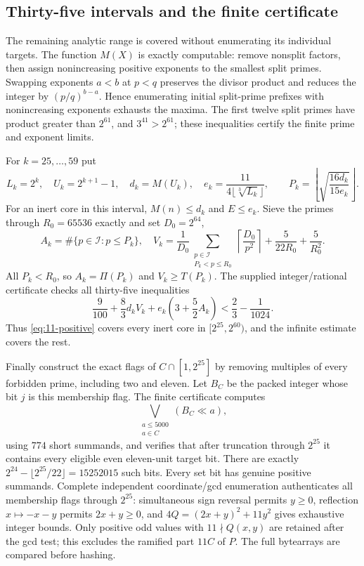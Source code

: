 \subsection{Thirty-five intervals and the finite certificate}

The remaining analytic range is covered without enumerating its
individual targets.  The function $M(X)$ is exactly computable:
remove nonsplit factors, then assign nonincreasing positive exponents
to the smallest split primes.  Swapping exponents $a<b$ at $p<q$
preserves the divisor product and reduces the integer by
$(p/q)^{b-a}$.  Hence enumerating initial split-prime prefixes with
nonincreasing exponents exhausts the maxima.  The first twelve split
primes have product greater than $2^{61}$, and $3^{41}>2^{61}$;
these inequalities certify the finite prime and exponent limits.

For $k=25,\ldots,59$ put
\[
 L_k=2^k,\quad U_k=2^{k+1}-1,\quad d_k=M(U_k),\quad
 e_k=\frac{11}{4\lfloor\sqrt[3]{L_k}\rfloor},\qquad
 P_k=\left\lfloor\sqrt{\frac{16d_k}{15e_k}}\right\rfloor.
\]
For an inert core in this interval, $M(n)\le d_k$ and $E\le e_k$.
Sieve the primes through $R_0=65536$ exactly and set $D_0=2^{64}$,
\[
 A_k=\#\{p\in\mathcal I:p\le P_k\},\quad
 V_k=\frac1{D_0}\sum_{\substack{p\in\mathcal I\\P_k<p\le R_0}}
                   \left\lceil\frac{D_0}{p^2}\right\rceil
                  +\frac5{22R_0}+\frac5{R_0^2}.
\]
All $P_k<R_0$, so $A_k=\Pi(P_k)$ and $V_k\ge T(P_k)$.
The supplied integer/rational certificate checks all thirty-five
inequalities
\begin{equation}\label{eq:11-bins}
 \frac9{100}+\frac83d_kV_k+e_k\left(3+\frac52 A_k\right)
                         <\frac23-\frac1{1024}.
\end{equation}
Thus \eqref{eq:11-positive} covers every inert core in
$[2^{25},2^{60})$, and the infinite estimate covers the rest.

Finally construct the exact flags of $C\cap[1,2^{25}]$ by removing
multiples of every forbidden prime, including two and eleven.
Let $B_C$ be the packed integer whose bit $j$ is this membership flag.
The finite certificate computes
\[
             \bigvee_{\substack{a\le5000\\a\in C}}(B_C\ll a),
\]
using $774$ short summands, and verifies that after truncation through
$2^{25}$ it contains every eligible even eleven-unit target bit.
There are exactly
$2^{24}-\lfloor2^{25}/22\rfloor=15252015$ such bits.
Every set bit has genuine positive summands.  Complete independent
coordinate/gcd enumeration authenticates all membership flags through
$2^{25}$: simultaneous sign reversal permits $y\ge0$, reflection
$x\mapsto-x-y$ permits $2x+y\ge0$, and
$4Q=(2x+y)^2+11y^2$ gives exhaustive integer bounds.
Only positive odd values with $11\nmid Q(x,y)$ are retained after
the gcd test; this excludes the ramified part $11C$ of $P$.
The full bytearrays are compared before hashing.

